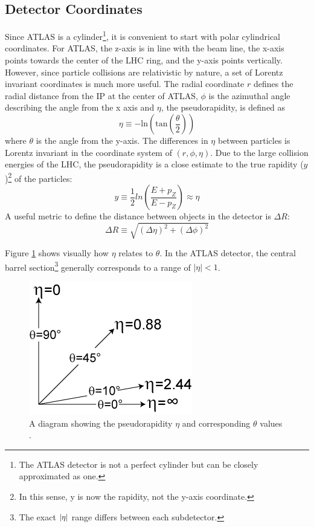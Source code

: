 	\subsection{Detector Coordinates}\label{ssec:coordinates}
		Since \gls{ATLAS} is a cylinder\footnote{The \gls{ATLAS} detector is not a perfect cylinder but can be closely approximated as one.}, it is convenient to start with polar cylindrical coordinates. For \gls{ATLAS}, the z-axis is in line with the beam line, the x-axis points towards the center of the \gls{LHC} ring, and the y-axis points vertically. However, since particle collisions are relativistic by nature, a set of Lorentz invariant coordinates is much more useful. The radial coordinate $r$ defines the radial distance from the \acrfull{IP} at the center of \gls{ATLAS}, $\phi$ is the azimuthal angle describing the angle from the x axis and $\eta$, the pseudorapidity, is defined as 
		\begin{equation}\label{eqn:eta}
		\eta \equiv - \mathrm{ln} \left( \mathrm{tan} \left( \frac{\theta}{2} \right) \right)
		\end{equation}
		where $\theta$ is the angle from the y-axis. The differences in $\eta$ between particles is Lorentz invariant in the coordinate system of $(r,\phi,\eta)$. Due to the large collision energies of the \gls{LHC}, the pseudorapidity is a close estimate to the true rapidity ($y$)\footnote{In this sense, y is now the rapidity, not the y-axis coordinate.} of the particles: 
		\begin{equation}\label{eqn:rapidity}
		y \equiv \frac{1}{2} ln(\frac{E+p_Z}{E-p_Z}) \approx \eta
		\end{equation}
		A useful metric to define the distance between objects in the detector is $\Delta R$:
		\begin{equation}\label{eqn:dR}
		\Delta R \equiv \sqrt{ (\Delta \eta)^2 + (\Delta \phi)^2}
		\end{equation}

		Figure \ref{fig:pseudorapidity} shows visually how $\eta$ relates to $\theta$. In the \gls{ATLAS} detector, the central barrel section\footnote{The exact $|{\eta}|$ range differs between each subdetector.}  generally corresponds to a range of $|\eta|<1$.

		\begin{figure}[!ht]
		\centering
		\includegraphics[width=.25\textwidth,keepaspectratio=true]{chapters/chapter3_experiment/images/Pseudorapidity.png}
		\caption{ A diagram showing the pseudorapidity $\eta$ and corresponding $\theta$ values \cite{pseudorapidity}. }
		\label{fig:pseudorapidity}
		\end{figure}

